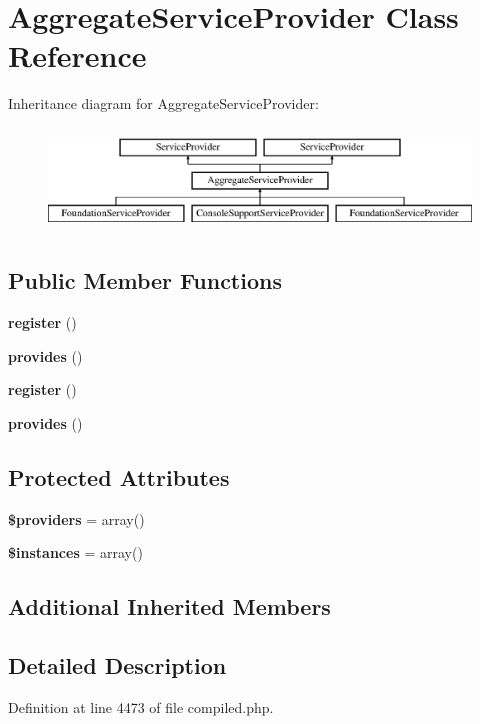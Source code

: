 \section{Aggregate\+Service\+Provider Class Reference}
\label{class_illuminate_1_1_support_1_1_aggregate_service_provider}
Inheritance diagram for Aggregate\+Service\+Provider\+:\begin{figure}[H]
\begin{center}
\leavevmode
\includegraphics[height=2.758621cm]{class_illuminate_1_1_support_1_1_aggregate_service_provider}
\end{center}
\end{figure}
\subsection*{Public Member Functions}
\begin{DoxyCompactItemize}
\item 
{\bf register} ()
\item 
{\bf provides} ()
\item 
{\bf register} ()
\item 
{\bf provides} ()
\end{DoxyCompactItemize}
\subsection*{Protected Attributes}
\begin{DoxyCompactItemize}
\item 
{\bf \$providers} = array()
\item 
{\bf \$instances} = array()
\end{DoxyCompactItemize}
\subsection*{Additional Inherited Members}


\subsection{Detailed Description}


Definition at line 4473 of file compiled.\+php.



